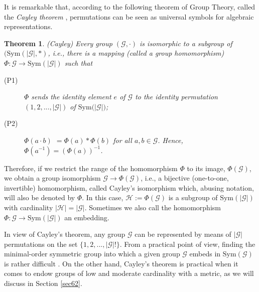 \documentclass[%
 aip,
 amsmath,amssymb,
 reprint,%
]{revtex4-1}
\newtheorem{theorem}{Theorem}
\begin{document}
It is remarkable that, according to the following theorem of Group Theory,
called the \textit{Cayley theorem} \cite{Herstein1996,Amigo2025},
permutations can be seen as universal symbols for algebraic representations.

\begin{theorem}
\label{ThmCayley}(Cayley) Every group $(\mathcal{G},\cdot )$ is isomorphic
to a subgroup of $(\mathrm{Sym}(\left\vert \mathcal{G}\right\vert ,\ast )$,
i.e., there is a mapping (called a group homomorphism) $\Phi :\mathcal{G}%
\rightarrow \mathrm{Sym}(\left\vert \mathcal{G}\right\vert )$ such that

\begin{description}
\item[(P1)] $\Phi $ sends the identity element $e$ of $\mathcal{G}$ to the
identity permutation $(1,2,...,\left\vert \mathcal{G}\right\vert )$ of $%
\mathrm{Sym}(\left\vert \mathcal{G}\right\vert \mathcal{)}$;

\item[(P2)] $\Phi (a\cdot b)$ $=\Phi (a)\ast \Phi (b)$ for all $a,b\in 
\mathcal{G}$. Hence, $\Phi (a^{-1})=(\Phi (a))^{-1}$.
\end{description}
\end{theorem}

Therefore, if we restrict the range of the homomorphism $\Phi $ to its
image, $\Phi (\mathcal{G})$, we obtain a group isomorphism $\mathcal{G}%
\rightarrow \Phi (\mathcal{G})$, i.e., a bijective (one-to-one, invertible)
homomorphism, called Cayley's isomorphism which, abusing notation, will also
be denoted by $\Phi $. In this case, $\mathcal{H}:=\Phi (\mathcal{G})$ is a
subgroup of $\mathrm{Sym}(\left\vert \mathcal{G}\right\vert )$ with
cardinality $\left\vert \mathcal{H}\right\vert =\left\vert \mathcal{G}%
\right\vert $. Sometimes we also call the homomorphism $\Phi :\mathcal{G}%
\rightarrow \mathrm{Sym}(\left\vert \mathcal{G}\right\vert )$ an embedding.

In view of Cayley's theorem, any group $\mathcal{G}$ can be represented by
means of $\left\vert \mathcal{G}\right\vert $ permutations on the set $%
\{1,2,...,\left\vert \mathcal{G}\right\vert !\}$. From a practical point of
view, finding the minimal-order symmetric group into which a given group $%
\mathcal{G}$ embeds in $\mathrm{Sym}(\mathcal{G})$ is rather difficult \cite%
{Johnson1971,Grechkoseeva2003}. On the other hand, Cayley's theorem is
practical when it comes to endow groups of low and moderate cardinality with
a metric, as we will discuss in Section \ref{sec62}.
\end{document}
